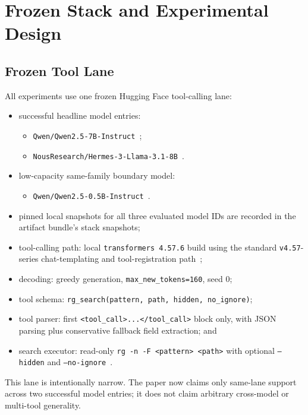 \documentclass[runningheads]{llncs}
\begin{document}
\section{Frozen Stack and Experimental Design}

\subsection{Frozen Tool Lane}

All experiments use one frozen Hugging Face tool-calling lane:

\begin{itemize}
\item successful headline model entries:
  \begin{itemize}
  \item \texttt{Qwen/Qwen2.5-7B-Instruct}~\cite{ref_qwen,ref_qwen_card};
  \item \texttt{NousResearch/Hermes-3-Llama-3.1-8B}~\cite{ref_hermes_card}.
  \end{itemize}
\item low-capacity same-family boundary model:
  \begin{itemize}
  \item \texttt{Qwen/Qwen2.5-0.5B-Instruct}~\cite{ref_qwen,ref_qwen_small_card}.
  \end{itemize}
\item pinned local snapshots for all three evaluated model IDs are recorded in the artifact bundle's stack snapshots;
\item tool-calling path: local \texttt{transformers 4.57.6} build using the standard \texttt{v4.57}-series chat-templating and tool-registration path~\cite{ref_transformers,ref_hfdocs};
\item decoding: greedy generation, \texttt{max\_new\_tokens=160}, seed \(0\);
\item tool schema: \texttt{rg\_search(pattern, path, hidden, no\_ignore)};
\item tool parser: first \texttt{<tool\_call>...</tool\_call>} block only, with JSON parsing plus conservative fallback field extraction; and
\item search executor: read-only \texttt{rg -n -F <pattern> <path>} with optional \texttt{--hidden} and \texttt{--no-ignore}~\cite{ref_rg}.
\end{itemize}

This lane is intentionally narrow. The paper now claims only same-lane support across two successful model entries; it does not claim arbitrary cross-model or multi-tool generality.
\end{document}
